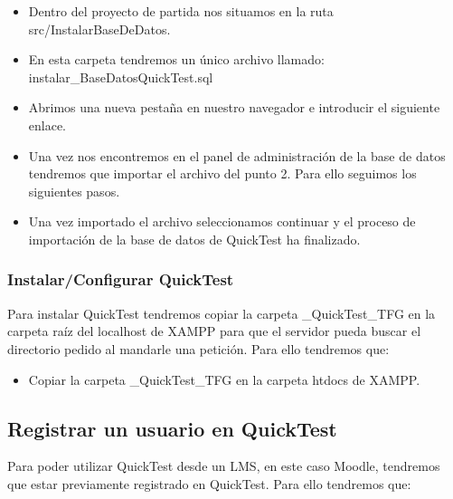 \begin{itemize}

	\item Dentro del proyecto de partida nos situamos en la ruta src/InstalarBaseDeDatos.
	
	\item En esta carpeta tendremos un único archivo llamado: instalar\_BaseDatosQuickTest.sql
	
	\item Abrimos una nueva pestaña en nuestro navegador e introducir el siguiente enlace. 
	
	\item Una vez nos encontremos en el panel de administración de la base de datos tendremos que importar el archivo del punto 2. Para ello seguimos los siguientes pasos. 
	
	\item Una vez importado el archivo seleccionamos continuar y el proceso de importación de la base de datos de QuickTest ha finalizado.

\end{itemize}

\subsubsection{Instalar/Configurar QuickTest}

Para instalar QuickTest tendremos copiar la carpeta \_QuickTest\_TFG en la carpeta raíz del localhost de XAMPP para que el servidor pueda buscar el directorio pedido al mandarle una petición.
Para ello tendremos que:

\begin{itemize}

	\item Copiar la carpeta \_QuickTest\_TFG en la carpeta htdocs de XAMPP. 

\end{itemize}

\subsection{Registrar un usuario en QuickTest}

Para poder utilizar QuickTest desde un LMS, en este caso Moodle, tendremos que estar previamente registrado en QuickTest. Para ello tendremos que:

